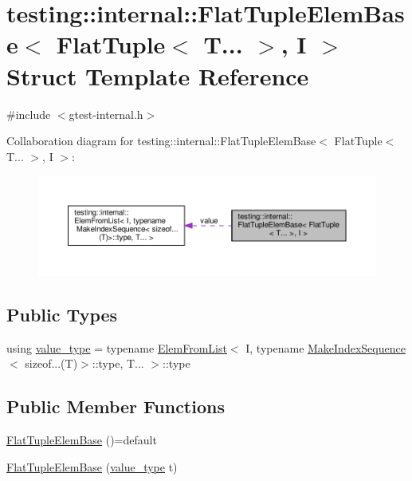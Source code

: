 \hypertarget{structtesting_1_1internal_1_1FlatTupleElemBase_3_01FlatTuple_3_01T_8_8_8_01_4_00_01I_01_4}{}\section{testing\+:\+:internal\+:\+:Flat\+Tuple\+Elem\+Base$<$ Flat\+Tuple$<$ T... $>$, I $>$ Struct Template Reference}
\label{structtesting_1_1internal_1_1FlatTupleElemBase_3_01FlatTuple_3_01T_8_8_8_01_4_00_01I_01_4}


{\ttfamily \#include $<$gtest-\/internal.\+h$>$}



Collaboration diagram for testing\+:\+:internal\+:\+:Flat\+Tuple\+Elem\+Base$<$ Flat\+Tuple$<$ T... $>$, I $>$\+:\nopagebreak
\begin{figure}[H]
\begin{center}
\leavevmode
\includegraphics[width=350pt]{structtesting_1_1internal_1_1FlatTupleElemBase_3_01FlatTuple_3_01T_8_8_8_01_4_00_01I_01_4__coll__graph}
\end{center}
\end{figure}
\subsection*{Public Types}
\begin{DoxyCompactItemize}
\item 
using \hyperlink{structtesting_1_1internal_1_1FlatTupleElemBase_3_01FlatTuple_3_01T_8_8_8_01_4_00_01I_01_4_a6b87a445f87724f9363b348e6c697766}{value\+\_\+type} = typename \hyperlink{structtesting_1_1internal_1_1ElemFromList}{Elem\+From\+List}$<$ I, typename \hyperlink{structtesting_1_1internal_1_1MakeIndexSequence}{Make\+Index\+Sequence}$<$ sizeof...(T)$>$\+::type, T... $>$\+::type
\end{DoxyCompactItemize}
\subsection*{Public Member Functions}
\begin{DoxyCompactItemize}
\item 
\hyperlink{structtesting_1_1internal_1_1FlatTupleElemBase_3_01FlatTuple_3_01T_8_8_8_01_4_00_01I_01_4_a7b460283c4ba5ad116a4305d05155546}{Flat\+Tuple\+Elem\+Base} ()=default
\item 
\hyperlink{structtesting_1_1internal_1_1FlatTupleElemBase_3_01FlatTuple_3_01T_8_8_8_01_4_00_01I_01_4_a153da382b00977dfb5974f85dd31ea58}{Flat\+Tuple\+Elem\+Base} (\hyperlink{structtesting_1_1internal_1_1FlatTupleElemBase_3_01FlatTuple_3_01T_8_8_8_01_4_00_01I_01_4_a6b87a445f87724f9363b348e6c697766}{value\+\_\+type} t)
\end{DoxyCompactItemize}
